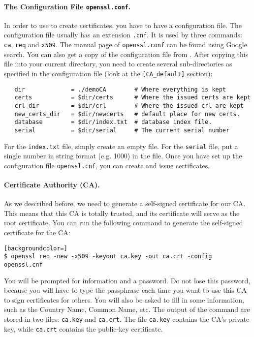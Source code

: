 \paragraph{The Configuration File {\tt openssl.conf}.}
In order to use \OpenSSL to create certificates, you have to have a 
configuration file.
The configuration file usually has an extension
{\tt .cnf}. It is used by three \OpenSSL commands: {\tt ca}, {\tt req} and {\tt x509}. 
The manual page of \texttt{openssl.conf} can be found using Google search.
You can also get a  copy of the configuration file from . 
After copying this file into your current directory, you need to 
create several sub-directories as specified in the configuration file (look
at the {\tt [CA\_default]} section):


\begin{lstlisting}
   dir             = ./demoCA        # Where everything is kept
   certs           = $dir/certs      # Where the issued certs are kept
   crl_dir         = $dir/crl        # Where the issued crl are kept
   new_certs_dir   = $dir/newcerts   # default place for new certs.
   database        = $dir/index.txt  # database index file.
   serial          = $dir/serial     # The current serial number
\end{lstlisting}

For the \texttt{index.txt} file, simply create an empty file. For 
the \texttt{serial} file, put a single number in string format (e.g. 1000) in the file.
Once you have set up the configuration file \texttt{openssl.cnf}, 
you can create and issue certificates.


\paragraph{Certificate Authority (CA).} 
As we described before, we need to generate a self-signed certificate for our
CA. This means that this CA is totally trusted, and its certificate will serve
as the root certificate.  You can run the following command to generate  
the self-signed certificate for the CA:


\begin{lstlisting}[backgroundcolor=]
$ openssl req -new -x509 -keyout ca.key -out ca.crt -config openssl.cnf
\end{lstlisting}

You will be prompted for information and a password. Do not lose this password,
because you will have to type the passphrase 
each time you want to use this CA to sign certificates for others.
You will also be asked to fill in some information,
such as the Country Name, Common Name, etc. 
The output of the command are stored in two files: {\tt ca.key} and 
{\tt ca.crt}. The file {\tt ca.key} contains the 
CA's private key, while {\tt ca.crt} contains the public-key certificate.



